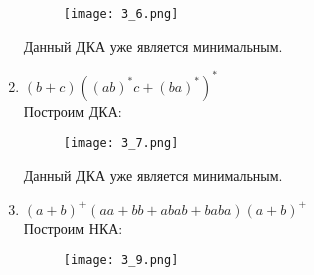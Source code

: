 \documentclass[12pt, a4paper]{article}
\begin{document}
\begin{enumerate}
    \begin{figure}[H]
        \centering
        \texttt{[image: 3\_6.png]}
    \end{figure}
    
Данный ДКА уже является минимальным.

    \item \((b+c)((ab)^*c+(ba)^*)^*\)
\\Построим ДКА:

\begin{comment}
digraph {
    rankdir="LR"
    "" [shape=point]
    q1 [shape=circle]
    q2 [shape=doublecircle]
    q3 [shape=circle]
    q4 [shape=circle]
    q5 [shape=circle]

    "" -> q1
    q1 -> q2 [label="b,c"]
    q2 -> q2 [label="c"]
    q2 -> q3 [label="a"]
    q2 -> q5 [label="b"]
    q3 -> q4 [label="b"]
    q4 -> q3 [label="a"]
    q4 -> q2 [label="c"]
    q5 -> q2 [label="a"]
}
\end{comment}

    \begin{figure}[H]
        \centering
        \texttt{[image: 3\_7.png]}
    \end{figure}

Данный ДКА уже является минимальным.


    \item \((a+b)^+(aa+bb+abab+baba)(a+b)^+\)
\\Построим НКА:

\begin{comment}
digraph {
    rankdir="LR"
    "" [shape=point]
    q1 [shape=circle]
    q2 [shape=circle]
    q3 [shape=circle]
    q4 [shape=circle]
    q5 [shape=circle]
    q6 [shape=circle]
    q7 [shape=circle]
    q8 [shape=circle]
    q9 [shape=circle]
    q10 [shape=circle]
    q11 [shape=doublecircle]

    "" -> q1
    q1 -> q2 [label="a,b"]
    q2 -> q1 [label="a,b"]
    q2 -> q3 [label="a"]
    q2 -> q4 [label="b"]
    q3 -> q5 [label="b"]
    q3 -> q9 [label="a"]
    q4 -> q6 [label="a"]
    q4 -> q10 [label="b"]
    q5 -> q7 [label="a"]
    q6 -> q8 [label="b"]
    q7 -> q9 [label="b"]
    q8 -> q10 [label="a"]
    q9 -> q11 [label="a,b"]
    q10 -> q11 [label="a,b"]
    q11 -> q11 [label="a,b"]
}
\end{comment}

    \begin{figure}[H]
        \centering
        \texttt{[image: 3\_9.png]}
    \end{figure}
 

\end{enumerate}
\end{document}
